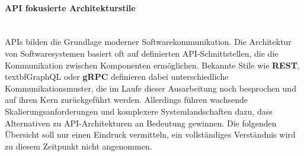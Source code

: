 \documentclass[../vs-script-first-v01.tex]{subfiles}
\begin{document}
\paragraph{API fokusierte Architekturstile}
\mbox{}\\
APIs bilden die Grundlage moderner Softwarekommunikation. Die Architektur von Softwaresystemen basiert oft auf definierten API-Schnittstellen, die die Kommunikation zwischen Komponenten ermöglichen. Bekannte Stile wie \textbf{REST}, textbf{GraphQL} oder \textbf{gRPC} definieren dabei unterschiedliche Kommunikationsmuster, die im Laufe dieser Ausarbeitung noch besprochen und auf ihren Kern zurückgeführt werden. 
Allerdings führen wachsende Skalierungsanforderungen und komplexere Systemlandschaften dazu, dass Alternativen zu API-Architekturen an Bedeutung gewinnen. Die folgenden Übersicht soll nur einen Eindruck vermitteln, ein vollständiges Verständnis wird zu diesem Zeitpunkt nicht angenommen.
\end{document}
